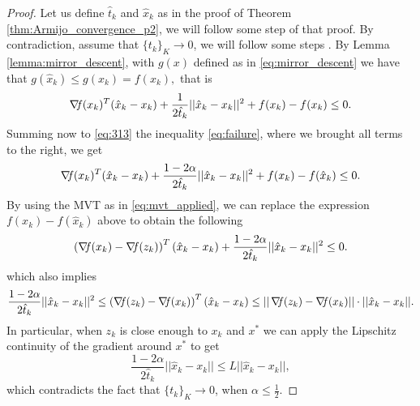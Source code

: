 \documentclass[10pt,a4paper]{article}
\begin{document}
\begin{proof} Let us define $\hat{t}_k$ and $\hat{x}_k$ as in the proof of Theorem \ref{thm:Armijo_convergence_p2}, we will follow some step of that proof. By contradiction, assume that $\{t_k\}_K\to 0$, we will follow some steps . By Lemma \ref{lemma:mirror_descent}, with $g(x)$ defined as in \eqref{eq:mirror_descent} we have that $g(\hat{x}_k)\leq g(x_k)=f(x_k),$ that is 
	\begin{equation}\label{eq:313}
		\operatorname*{\mathit{\nabla \!f}}(x_k)^T(\hat{x}_k-x_k) + \frac{1}{2\hat{t}_k} ||\hat{x}_k-x_k||^2 +f(x_k) - f(x_k) \leq 0.
	\end{equation}
Summing now to \eqref{eq:313} the inequality \eqref{eq:failure}, where we brought all terms to the right, we get
\begin{equation*}
	 \operatorname*{\mathit{\nabla \!f}}(x_k)^T(\hat{x}_k-x_k) + \frac{1-2\alpha}{2\hat{t}_k} ||\hat{x}_k-x_k||^2 +f(x_k) - f(\hat{x}_k)  \leq 0.
\end{equation*}
	By using the MVT as in \eqref{eq:mvt_applied}, we can replace the expression $f(x_k) - f(\hat{x}_k) $ above to obtain the following 
	\begin{equation*}
		\left(\operatorname*{\mathit{\nabla \!f}}(x_k)- \operatorname*{\mathit{\nabla \!f}}(z_k)\right)^T(\hat{x}_k-x_k) + \frac{1-2\alpha}{2\hat{t}_k} ||\hat{x}_k-x_k||^2\leq 0.
	\end{equation*}
	which also implies
	\begin{equation*}
		\frac{1-2\alpha}{2\hat{t}_k} ||\hat{x}_k-x_k||^2\leq \left(\operatorname*{\mathit{\nabla \!f}}(z_k)- \operatorname*{\mathit{\nabla \!f}}(x_k)\right)^T(\hat{x}_k-x_k)\leq ||\operatorname*{\mathit{\nabla \!f}}(z_k)- \operatorname*{\mathit{\nabla \!f}}(x_k)||\cdot ||\hat{x}_k-x_k||.
	\end{equation*}
	In particular, when $z_k$ is close enough to $x_k$ and $x^*$ we can apply the Lipschitz continuity of the gradient around $x^*$ to get 
	\begin{equation*}
		\frac{1-2\alpha}{2\hat{t}_k} ||\hat{x}_k-x_k|| \leq L||\hat{x}_k-x_k||,
	\end{equation*}
	which contradicts the fact that $\{t_k\}_K\to 0$, when $\alpha\leq \frac{1}{2}$.
\end{proof}

\end{document}
